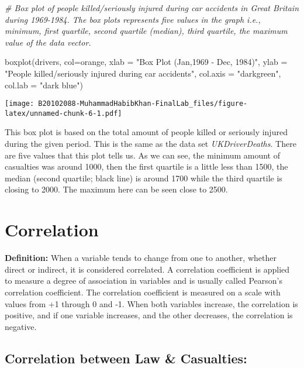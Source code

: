 \documentclass[
]{article}
\newenvironment{Shaded}{\begin{snugshade}}{\end{snugshade}}
\newcommand{\AttributeTok}[1]{\textcolor[rgb]{0.77,0.63,0.00}{#1}}
\newcommand{\CommentTok}[1]{\textcolor[rgb]{0.56,0.35,0.01}{\textit{#1}}}
\newcommand{\FunctionTok}[1]{\textcolor[rgb]{0.00,0.00,0.00}{#1}}
\newcommand{\NormalTok}[1]{#1}
\newcommand{\StringTok}[1]{\textcolor[rgb]{0.31,0.60,0.02}{#1}}
\begin{document}
\begin{Shaded}
\begin{Highlighting}[]
\CommentTok{\# Box plot of people killed/seriously injured during car accidents in Great Britain during 1969{-}1984. The box plots represents five values in the graph i.e., minimum, first quartile, second quartile (median), third quartile, the maximum value of the data vector.}

\FunctionTok{boxplot}\NormalTok{(drivers, }\AttributeTok{col=}\StringTok{\textquotesingle{}orange\textquotesingle{}}\NormalTok{, }\AttributeTok{xlab =} \StringTok{"Box Plot (Jan,1969 {-} Dec, 1984)"}\NormalTok{, }\AttributeTok{ylab =} \StringTok{"People killed/seriously injured during car accidents"}\NormalTok{, }\AttributeTok{col.axis =} \StringTok{"darkgreen"}\NormalTok{, }\AttributeTok{col.lab =} \StringTok{"dark blue"}\NormalTok{)}
\end{Highlighting}
\end{Shaded}

\texttt{[image: B20102088-MuhammadHabibKhan-FinalLab\_files/figure-latex/unnamed-chunk-6-1.pdf]}

This box plot is based on the total amount of people killed or seriously
injured during the given period. This is the same as the data set
\emph{UKDriverDeaths}. There are five values that this plot tells us. As
we can see, the minimum amount of casualties was around 1000, then the
first quartile is a little less than 1500, the median (second quartile;
black line) is around 1700 while the third quartile is closing to 2000.
The maximum here can be seen close to 2500.

\hypertarget{correlation}{%
\section{Correlation}\label{correlation}}

\textbf{Definition:} When a variable tends to change from one to
another, whether direct or indirect, it is considered correlated. A
correlation coefficient is applied to measure a degree of association in
variables and is usually called Pearson's correlation coefficient. The
correlation coefficient is measured on a scale with values from +1
through 0 and -1. When both variables increase, the correlation is
positive, and if one variable increases, and the other decreases, the
correlation is negative.

\hypertarget{correlation-between-law-casualties}{%
\subsection{Correlation between Law \&
Casualties:}\label{correlation-between-law-casualties}}
\end{document}
